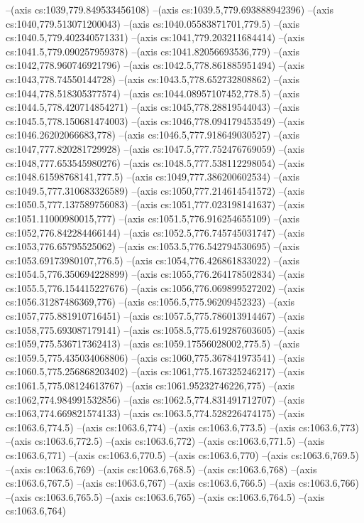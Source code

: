 --(axis cs:1039,779.849533456108)
--(axis cs:1039.5,779.693888942396)
--(axis cs:1040,779.513071200043)
--(axis cs:1040.05583871701,779.5)
--(axis cs:1040.5,779.402340571331)
--(axis cs:1041,779.203211684414)
--(axis cs:1041.5,779.090257959378)
--(axis cs:1041.82056693536,779)
--(axis cs:1042,778.960746921796)
--(axis cs:1042.5,778.861885951494)
--(axis cs:1043,778.74550144728)
--(axis cs:1043.5,778.652732808862)
--(axis cs:1044,778.518305377574)
--(axis cs:1044.08957107452,778.5)
--(axis cs:1044.5,778.420714854271)
--(axis cs:1045,778.28819544043)
--(axis cs:1045.5,778.150681474003)
--(axis cs:1046,778.094179453549)
--(axis cs:1046.26202066683,778)
--(axis cs:1046.5,777.918649030527)
--(axis cs:1047,777.820281729928)
--(axis cs:1047.5,777.752476769059)
--(axis cs:1048,777.653545980276)
--(axis cs:1048.5,777.538112298054)
--(axis cs:1048.61598768141,777.5)
--(axis cs:1049,777.386200602534)
--(axis cs:1049.5,777.310683326589)
--(axis cs:1050,777.214614541572)
--(axis cs:1050.5,777.137589756083)
--(axis cs:1051,777.023198141637)
--(axis cs:1051.11000980015,777)
--(axis cs:1051.5,776.916254655109)
--(axis cs:1052,776.842284466144)
--(axis cs:1052.5,776.745745031747)
--(axis cs:1053,776.65795525062)
--(axis cs:1053.5,776.542794530695)
--(axis cs:1053.69173980107,776.5)
--(axis cs:1054,776.426861833022)
--(axis cs:1054.5,776.350694228899)
--(axis cs:1055,776.264178502834)
--(axis cs:1055.5,776.154415227676)
--(axis cs:1056,776.069899527202)
--(axis cs:1056.31287486369,776)
--(axis cs:1056.5,775.96209452323)
--(axis cs:1057,775.881910716451)
--(axis cs:1057.5,775.786013914467)
--(axis cs:1058,775.693087179141)
--(axis cs:1058.5,775.619287603605)
--(axis cs:1059,775.536717362413)
--(axis cs:1059.17556028002,775.5)
--(axis cs:1059.5,775.435034068806)
--(axis cs:1060,775.367841973541)
--(axis cs:1060.5,775.256868203402)
--(axis cs:1061,775.167325246217)
--(axis cs:1061.5,775.08124613767)
--(axis cs:1061.95232746226,775)
--(axis cs:1062,774.984991532856)
--(axis cs:1062.5,774.831491712707)
--(axis cs:1063,774.669821574133)
--(axis cs:1063.5,774.528226474175)
--(axis cs:1063.6,774.5)
--(axis cs:1063.6,774)
--(axis cs:1063.6,773.5)
--(axis cs:1063.6,773)
--(axis cs:1063.6,772.5)
--(axis cs:1063.6,772)
--(axis cs:1063.6,771.5)
--(axis cs:1063.6,771)
--(axis cs:1063.6,770.5)
--(axis cs:1063.6,770)
--(axis cs:1063.6,769.5)
--(axis cs:1063.6,769)
--(axis cs:1063.6,768.5)
--(axis cs:1063.6,768)
--(axis cs:1063.6,767.5)
--(axis cs:1063.6,767)
--(axis cs:1063.6,766.5)
--(axis cs:1063.6,766)
--(axis cs:1063.6,765.5)
--(axis cs:1063.6,765)
--(axis cs:1063.6,764.5)
--(axis cs:1063.6,764)
